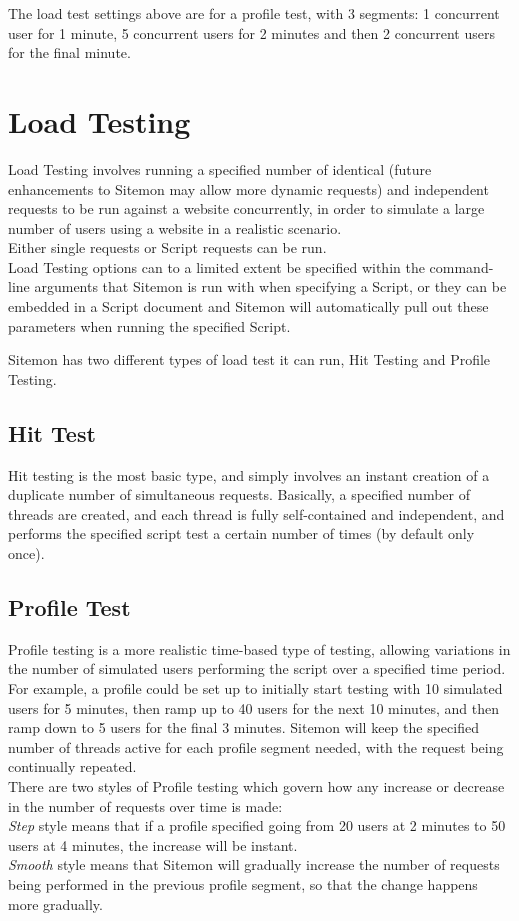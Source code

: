 \documentclass[a4paper]{article}
\begin{document}
The load test settings above are for a profile test, with 3 segments: 1 concurrent user for 1 minute, 5 concurrent users for
 2 minutes and then 2 concurrent users for the final minute.

\pagebreak

\section{Load Testing} \label{sec:load_testing}

Load Testing involves running a specified number of identical (future enhancements to Sitemon may allow more dynamic requests)
 and independent requests to be run against a website concurrently, in order to simulate a large number of users using a website
 in a realistic scenario.\\

 Either single requests or Script requests can be run.\\
 
Load Testing options can to a limited extent be specified within the command-line arguments that Sitemon is run with when
 specifying a Script, or they can be embedded in a Script document and Sitemon will automatically pull out these parameters
 when running the specified Script.
 
Sitemon has two different types of load test it can run, Hit Testing and Profile Testing.

\subsection{Hit Test}
Hit testing is the most basic type, and simply involves an instant creation of a duplicate number of simultaneous requests. Basically,
a specified number of threads are created, and each thread is fully self-contained and independent, and performs the specified script
test a certain number of times (by default only once).

\subsection{Profile Test}
Profile testing is a more realistic time-based type of testing, allowing variations in the number of simulated users performing the 
 script over a specified time period. For example, a profile could be set up to initially start testing with 10 simulated
 users for 5 minutes, then ramp up to 40 users for the next 10 minutes, and then ramp down to 5 users for the final 3
 minutes. Sitemon will keep the specified number of threads active for each profile segment needed, with the request being
 continually repeated.\\ There are two styles of Profile testing which govern how any increase or decrease in the number of requests
 over time is made:\\ {\em Step} style means that if a profile specified going from 20 users at 2 minutes to 50 users
 at 4 minutes, the increase will be instant.\\
 {\em Smooth} style means that Sitemon will gradually increase the number of requests being performed in the previous profile segment,
 so that the change happens more gradually.
\end{document}

